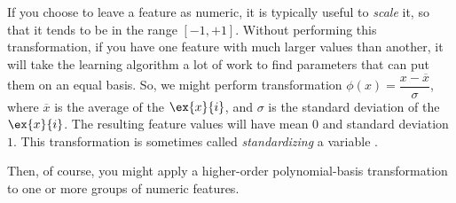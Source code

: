 If you choose to leave a feature as numeric, it is typically useful to
{\em scale} it, so that it tends to be in the range $[-1, +1]$.
Without performing this transformation, if you have one feature with
much larger values than another, it will take the learning algorithm a
lot of work to find parameters that can put them on an equal basis.
So, we might perform transformation
$\phi(x) = \dfrac{x - \overline{x}}{\sigma}$, where $\overline{x}$
is the average of the $\ex{x}{i}$, and $\sigma$ is the standard deviation of
the $\ex{x}{i}$.  The resulting feature values will have mean $0$ and 
standard deviation $1$.   This transformation is sometimes called {\em
  standardizing} a variable .

Then, of course, you might apply a higher-order polynomial-basis
transformation to one or more groups of numeric features.




